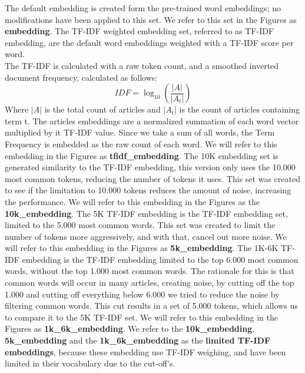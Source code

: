 \documentclass[../../Thesis.tex]{subfiles}
\begin{document}
The default embedding is created form the pre-trained word embeddings; no modifications have been applied to this set. We refer to this set in the Figures as \textbf{embedding}.
The TF-IDF weighted embedding set, referred to as TF-IDF embedding, are the default word embeddings weighted with a TF-IDF score per word.\\
The TF-IDF is calculated with a raw token count, and a smoothed inverted document frequency, calculated as follows:\\
\begin{equation}
IDF = \log_{10}(\dfrac{|A|}{|A_t|})
\end{equation}
Where $|A|$ is the total count of articles and $|A_t|$ is the count of articles containing term t.
The articles embeddings are a normalized summation of each word vector multiplied by it TF-IDF value. Since we take a sum of all words, the Term Frequency is embedded as the raw count of each word. We will refer to this embedding in the Figures as \textbf{tfidf\_embedding}.
The 10K embedding set is generated similarity to the TF-IDF embedding, this version only uses the 10.000 most common tokens, reducing the number of tokens it uses. This set was created to see if the limitation to 10.000 tokens reduces the amount of noise, increasing the performance. We will refer to this embedding in the Figures as the \textbf{10k\_embedding}.
The 5K TF-IDF embedding is the TF-IDF embedding set, limited to the 5.000 most common words. This set was created to limit the number of tokens more aggressively, and with that, cancel out more noise. We will refer to this embedding in the Figures as \textbf{5k\_embedding}.
The 1K-6K TF-IDF embedding is the TF-IDF embedding limited to the top 6.000 most common words, without the top 1.000 most common words. The rationale for this is that common words will occur in many articles, creating noise, by cutting off the top 1.000 and cutting off everything below 6.000 we tried to reduce the noise by filtering common words. This cut results in a set of 5.000 tokens, which allows us to compare it to the 5K TF-IDF set. We will refer to this embedding in the Figures as \textbf{1k\_6k\_embedding}. We refer to the \textbf{10k\_embedding}, \textbf{5k\_embedding} and the \textbf{1k\_6k\_embedding} as the \textbf{limited TF-IDF embeddings}, because these embedding use TF-IDF weighing, and have been limited in their vocabulary due to the cut-off's.
\end{document}
